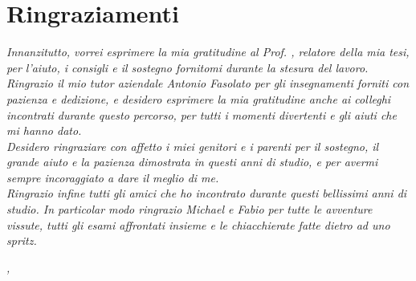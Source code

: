 \cleardoublepage
{}
{}



\bigskip

\begingroup
\let\clearpage\relax
\let\cleardoublepage\relax
\let\cleardoublepage\relax

\chapter*{Ringraziamenti}

\noindent \textit{Innanzitutto, vorrei esprimere la mia gratitudine al Prof. \myProf, relatore della mia tesi, per l'aiuto, i consigli e il sostegno fornitomi durante la stesura del lavoro.}\\

\noindent \textit{Ringrazio il mio tutor aziendale Antonio Fasolato per gli insegnamenti forniti con pazienza e dedizione, e desidero esprimere la mia gratitudine anche ai colleghi incontrati durante questo percorso, per tutti i momenti divertenti e gli aiuti che mi hanno dato.}\\

\noindent \textit{Desidero ringraziare con affetto i miei genitori e i parenti per il sostegno, il grande aiuto e la pazienza dimostrata in questi anni di studio, e per avermi sempre incoraggiato a dare il meglio di me.}\\

\noindent \textit{Ringrazio infine tutti gli amici che ho incontrato durante questi bellissimi anni di studio. In particolar modo ringrazio Michael e Fabio per tutte le avventure vissute, tutti gli esami affrontati insieme e le chiacchierate fatte dietro ad uno spritz.}\\
\bigskip


\noindent\textit{\myLocation, \myTime}
\hfill \myName

\endgroup
